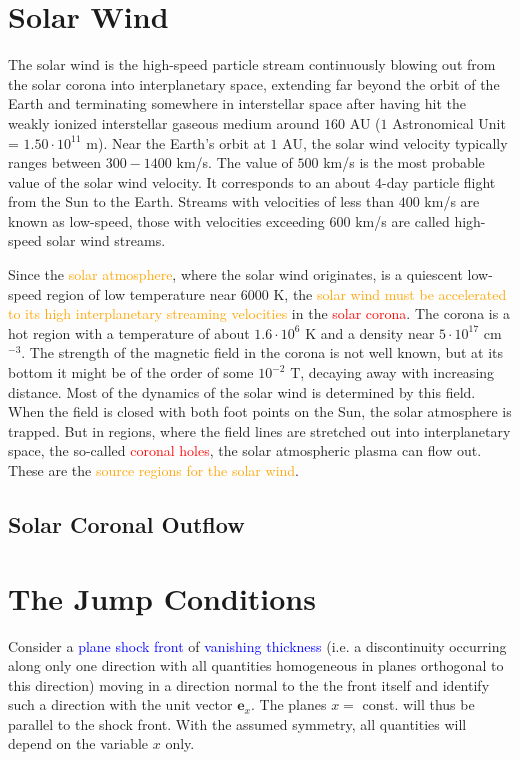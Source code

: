 \documentclass[12pt,a4paper]{article}
\renewcommand{\vec}[1]{\boldsymbol{#1}}
\begin{document}
\section{Solar Wind}
\cite{1996bspp.book.....B} The solar wind is the high-speed particle stream continuously blowing out from the solar corona into interplanetary space, extending far beyond the orbit of the Earth and terminating somewhere in interstellar space after having hit the weakly ionized interstellar gaseous medium around $160$ AU ($1$ Astronomical Unit = $1.50 \cdot 10^{11}$ m). Near the Earth's orbit at $1$ AU, the solar wind velocity typically ranges between $300-1400$ km/s. The value of $500$ km/s is the most probable value of the solar wind velocity. It corresponds to an about $4$-day particle flight from the Sun to the Earth. Streams with velocities of less than $400$ km/s are known as low-speed, those with velocities exceeding $600$ km/s are called high-speed solar wind streams.

Since the \textcolor{orange}{solar atmosphere}, where the solar wind originates, is a quiescent low-speed region of low temperature near 6000 K, the \textcolor{orange}{solar wind must be accelerated to its high interplanetary streaming velocities} in the \textcolor{red}{solar corona}. The corona is a hot region with a temperature of about $1.6 \cdot 10^6$ K and a density near $5 \cdot 10^{17}$ cm$^{-3}$. The strength of the magnetic field in the corona is not well known, but at its bottom it might be of the order of some $10^{-2}$ T, decaying away with increasing distance. Most of the dynamics of the solar wind is determined by this field. When the field is closed with both foot points on the Sun, the solar atmosphere is trapped. But in regions, where the field lines are stretched out into interplanetary space, the so-called \textcolor{red}{coronal holes}, the solar atmospheric plasma can flow out. These are the \textcolor{orange}{source regions for the solar wind}.

\subsection{Solar Coronal Outflow}
\cite{1996bspp.book.....B} 











\section{The Jump Conditions}
\cite{2015bps..book.....C} Consider a \textcolor{blue}{plane shock front} of \textcolor{blue}{vanishing thickness} (i.e. a discontinuity occurring along only one direction with all quantities homogeneous in planes orthogonal to this direction) moving in a direction normal to the the front itself and identify such a direction with the unit vector $\vec{e}_x$. The planes $x =$ const. will thus be parallel to the
shock front. With the assumed symmetry, all quantities will depend on the variable $x$ only.
\end{document}
